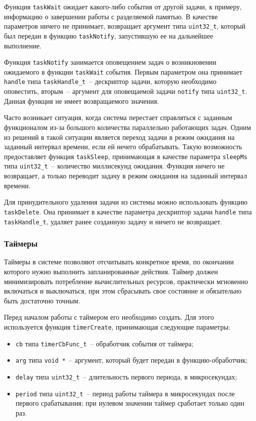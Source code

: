 Функция \lstinline{taskWait} ожидает какого-либо события от другой задачи, к примеру, информацию о завершении работы с разделяемой памятью. В качестве параметров ничего не принимает, возвращает аргумент типа \lstinline{uint32_t}, который был передан в функцию \lstinline{taskNotify}, запустившую ее на дальнейшее выполнение.

Функция \lstinline{taskNotify} занимается оповещением задач о возникновении ожидаемого в функции \lstinline{taskWait} события. Первым параметром она принимает \lstinline{handle} типа \lstinline{taskHandle_t}~-- дескриптор задачи, которую необходимо оповестить, вторым~-- аргумент для оповещаемой задачи \lstinline{notify} типа \lstinline{uint32_t}.
Данная функция не имеет возвращаемого значения.

Часто возникает ситуация, когда система перестает справляться с заданным функционалом из-за большого количества параллельно работающих задач. Одним
из решений в такой ситуации является переход задачи в режим ожидания на заданный интервал времени, если ей нечего обрабатывать. Такую возможность предоставляет
функция \lstinline{taskSleep}, принимающая в качестве параметра \lstinline{sleepMs} типа \lstinline{uint32_t}~-- количество миллисекунд ожидания. Функция ничего не возвращает, а
только переводит задачу в режим ожидания на заданный интервал времени.

Для принудительного удаления задачи из системы можно использовать функцию \lstinline{taskDelete}. Она принимает в качестве параметра дескриптор задачи
\lstinline{handle} типа \lstinline{taskHandle_t}, удаляет ранее созданную задачу и ничего не возвращает.

\subsubsection{Таймеры}

Таймеры в системе позволяют отсчитывать конкретное время, по окончании которого нужно выполнить запланированные действия. Таймер должен минимизировать потребление вычислительных ресурсов, практически мгновенно включаться и выключаться, при этом сбрасывать свое состояние и обязательно быть достаточно точным.

Перед началом работы с таймером его необходимо создать. Для этого используется функция \lstinline{timerCreate}, принимающая следующие параметры:

\begin{itemize}
    \item \lstinline{cb} типа \lstinline{timerCbFunc_t}~-- обработчик события от таймера;
    \item \lstinline{arg} типа \lstinline{void *}~-- аргумент, который будет передан в функцию-обработчик;
    \item \lstinline{delay} типа \lstinline{uint32_t}~-- длительность первого периода, в микросекундах;
    \item \lstinline{period} типа \lstinline{uint32_t}~-- период работы таймера в микросекундах после первого срабатывания; при нулевом значении таймер сработает только один раз.
\end{itemize}

